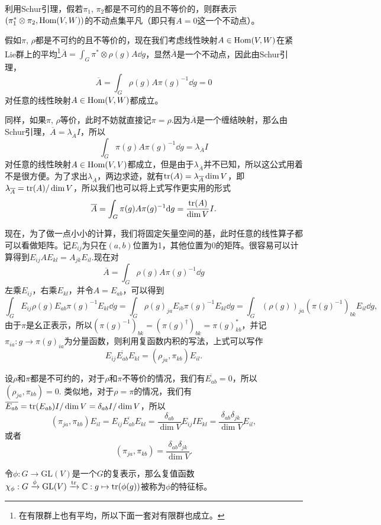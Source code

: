 \para 利用Schur引理，假若$\pi_1$, $\pi_2$都是不可约的且不等价的，则群表示$(\pi_1^*\otimes\pi_2,\operatorname{Hom}(V,W))$的不动点集平凡（即只有$A=0$这一个不动点）。

假如$\pi$, $\rho$都是不可约的且不等价的，现在我们考虑线性映射$A\in \operatorname{Hom}(V,W)$在紧Lie群上的平均\footnote{在有限群上也有平均，所以下面一套对有限群也成立。}$\overline{A}=\int_G \pi^*\otimes\rho(g)A \dd g$，显然$\overline{A}$是一个不动点，因此由Schur引理，
\[
	\overline{A}=\int_G \rho(g)A\pi(g)^{-1}\dd g=0
\]
对任意的线性映射$A\in \operatorname{Hom}(V,W)$都成立。

同样，如果$\pi$, $\rho$等价，此时不妨就直接记$\pi=\rho$.因为$\overline{A}$是一个缠结映射，那么由Schur引理，$\overline{A}=\lambda_{\overline{A}} I$，所以
\[
	\int_G \pi(g)A\pi(g)^{-1}\dd g=\lambda_{\overline{A}} I
\]
对任意的线性映射$A\in \operatorname{Hom}(V,V)$都成立，但是由于$\lambda_{\overline{A}}$并不已知，所以这公式用着不是很方便。为了求出$\lambda_{\overline{A}}$，两边求迹，就有$\operatorname{tr}(A)=\lambda_{\overline{A}} \dim V$，即$\lambda_{\overline{A}}=\operatorname{tr}(A)/\dim V$，所以我们也可以将上式写作更实用的形式
\[
	\overline{A}=\int_G \pi(g)A\pi(g)^{-1}\mathrm{d} g=\frac{\operatorname{tr}(A)}{\dim V}I.
\]

\para 现在，为了做一点小小的计算，我们将固定矢量空间的基，此时任意的线性算子都可以看做矩阵。记$E_{ij}$为只在$(a,b)$位置为1，其他位置为0的矩阵。很容易可以计算得到$E_{ij}AE_{kl}=A_{jk}E_{il}$.现在对
\[
	\overline{A}=\int_G \rho(g)A\pi(g)^{-1}\dd g
\]
左乘$E_{ij}$，右乘$E_{kl}$，并令$A=E_{ab}$，可以得到
\[
	\int_G E_{ij}\rho(g)E_{ab}\pi(g)^{-1}E_{kl}\dd g=\int_G \rho(g)_{ja}E_{ib}\pi(g)^{-1}E_{kl}\dd g=\int_G (\rho(g))_{ja}\left(\pi(g)^{-1}\right)_{bk}E_{il}\dd g,
\]
由于$\pi$是幺正表示，所以$\left(\pi(g)^{-1}\right)_{bk}=\left(\pi(g)^{\dag}\right)_{bk}=\pi(g)_{kb}^*$，并记$\pi_{ia}:g\to \pi(g)_{ia}$为分量函数，则利用复函数内积的写法，上式可以写作
\[
	E_{ij}\overline{E_{ab}}E_{kl}=\left(\rho_{ja},\pi_{kb}\right)E_{il}.
\]

\para 设$\rho$和$\pi$都是不可约的，对于$\rho$和$\pi$不等价的情况，我们有$\overline{E_{ab}}=0$，所以$\left(\rho_{ja},\pi_{kb}\right)=0$. 类似地，对于$\rho=\pi$的情况，我们有$\overline{E_{ab}}=\operatorname{tr}(E_{ab})I/\dim V=\delta_{ab}I/\dim V$，所以
\[
	\left(\pi_{ja},\pi_{kb}\right)E_{il}=E_{ij}\overline{E_{ab}}E_{kl}=\frac{\delta_{ab}}{\dim V}E_{ij}IE_{kl}=\frac{\delta_{ab}\delta_{jk}}{\dim V}E_{il},
\]
或者
\[
	\left(\pi_{ja},\pi_{kb}\right)=\frac{\delta_{ab}\delta_{jk}}{\dim V}.
\]

\para 令$\phi:G\to \mathrm{GL}(V)$是一个$G$的复表示，那么复值函数$\chi_\phi:G\xrightarrow{\phi}\mathrm{GL}(V)\xrightarrow{\operatorname{tr}}\mathbb{C}:g\mapsto \operatorname{tr}(\phi(g))$被称为$\phi$的特征标。

